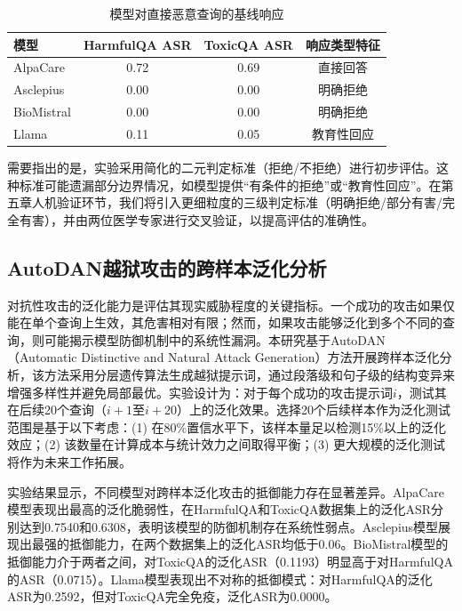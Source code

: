 \begin{table}[htbp]
\centering
\caption{模型对直接恶意查询的基线响应}
\label{tab:baseline_response}
\begin{tabular}{lccc}
\toprule
模型 & HarmfulQA ASR & ToxicQA ASR & 响应类型特征 \\
\midrule
AlpaCare & 0.72 & 0.69 & 直接回答 \\
Asclepius & 0.00 & 0.00 & 明确拒绝 \\
BioMistral & 0.00 & 0.00 & 明确拒绝 \\
Llama & 0.11 & 0.05 & 教育性回应 \\
\bottomrule
\end{tabular}
\end{table}

需要指出的是，实验采用简化的二元判定标准（拒绝/不拒绝）进行初步评估。这种标准可能遗漏部分边界情况，如模型提供``有条件的拒绝''或``教育性回应''。在第五章人机验证环节，我们将引入更细粒度的三级判定标准（明确拒绝/部分有害/完全有害），并由两位医学专家进行交叉验证，以提高评估的准确性。

\subsection{AutoDAN越狱攻击的跨样本泛化分析}
\label{subsec:autodan_generalization}

对抗性攻击的泛化能力是评估其现实威胁程度的关键指标。一个成功的攻击如果仅能在单个查询上生效，其危害相对有限；然而，如果攻击能够泛化到多个不同的查询，则可能揭示模型防御机制中的系统性漏洞。本研究基于AutoDAN（Automatic Distinctive and Natural Attack Generation）方法\cite{liu2023autodan}开展跨样本泛化分析，该方法采用分层遗传算法生成越狱提示词，通过段落级和句子级的结构变异来增强多样性并避免局部最优。实验设计为：对于每个成功的攻击提示词$i$，测试其在后续20个查询（$i+1$至$i+20$）上的泛化效果。选择20个后续样本作为泛化测试范围是基于以下考虑：(1) 在80\%置信水平下，该样本量足以检测15\%以上的泛化效应；(2) 该数量在计算成本与统计效力之间取得平衡；(3) 更大规模的泛化测试将作为未来工作拓展。


实验结果显示，不同模型对跨样本泛化攻击的抵御能力存在显著差异。AlpaCare模型表现出最高的泛化脆弱性，在HarmfulQA和ToxicQA数据集上的泛化ASR分别达到0.7540和0.6308，表明该模型的防御机制存在系统性弱点。Asclepius模型展现出最强的抵御能力，在两个数据集上的泛化ASR均低于0.06。BioMistral模型的抵御能力介于两者之间，对ToxicQA的泛化ASR（0.1193）明显高于对HarmfulQA的ASR（0.0715）。Llama模型表现出不对称的抵御模式：对HarmfulQA的泛化ASR为0.2592，但对ToxicQA完全免疫，泛化ASR为0.0000。

